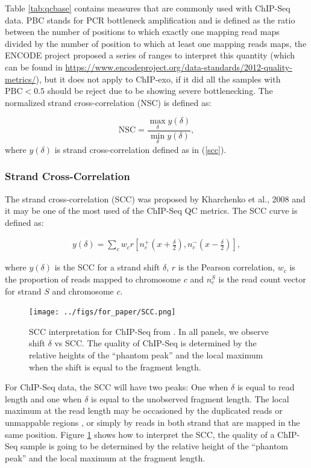 \documentclass[11pt]{article}\usepackage[]{graphicx}\usepackage[]{color}
\begin{document}
Table \ref{tab:qcbase} contains measures that are commonly used with
ChIP-Seq data. PBC stands for PCR bottleneck amplification and is
defined as the ratio between the number of positions to which exactly
one mapping read maps divided by the number of position to which at
least one mapping reads maps, the ENCODE project proposed a series of
ranges to interpret this quantity (which can be found in
\url{https://www.encodeproject.org/data-standards/2012-quality-metrics/}),
but it does not apply to ChIP-exo, if it did all the samples with
$\mbox{PBC} < 0.5$ should be reject due to be showing severe
bottlenecking. The normalized strand cross-correlation (NSC) is
defined as:

\[
\mbox{NSC} = \frac{ \max_\delta y(\delta)}{\min_\delta y(\delta)},
\]
where $y(\delta)$ is strand cross-correlation defined as in (\ref{scc}). 

\subsubsection{Strand Cross-Correlation}
\label{sec:scc}

The strand cross-correlation (SCC) was proposed by Kharchenko et al.,
2008 \cite{strandcc} and it may be one of the most used of the
ChIP-Seq QC metrics. The SCC curve is defined as:

\begin{align}
  y(\delta) = \sum_c w_c r\left[ n_c^+ \left(x + \frac{\delta}{2}
    \right), n_c^- \left( x- \frac{\delta}{2} \right)\right],
\label{scc}
\end{align}

where $y(\delta)$ is the SCC for a strand shift $\delta$, $r$ is the
Pearson correlation, $w_c$ is the proportion of reads mapped to
chromosome $c$ and $n_c^S$ is the read count vector for strand $S$ and
chromosome $c$.

\begin{figure}[H]
  \centering
  \texttt{[image: ../figs/for\_paper/SCC.png]}
  \caption{SCC interpretation for ChIP-Seq from \cite{encode_qc}. In
    all panels, we observe shift $\delta$ vs SCC. The quality of
    ChIP-Seq is determined by the relative heights of the ``phantom
    peak'' and the local maximum when the shift is equal to the
    fragment length.}
  \label{fig:scc_landt}
\end{figure}

For ChIP-Seq data, the SCC will have two peaks: One when $\delta$ is
equal to read length and one when $\delta$ is equal to the unobserved
fragment length. The local maximum at the read length may be
occasioned by the duplicated reads or unmappable regions
\cite{carroll.qc}, or simply by reads in both strand that are mapped
in the same position. Figure \ref{fig:scc_landt} shows how to
interpret the SCC, the quality of a ChIP-Seq sample is going to be
determined by the relative height of the ``phantom peak'' and the
local maximum at the fragment length.
\end{document}
